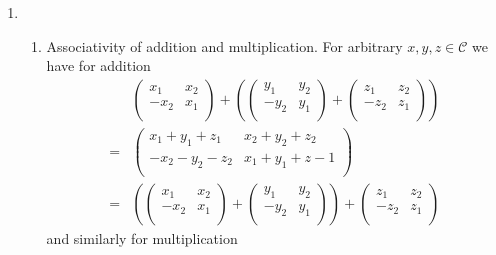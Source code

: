 \documentclass{article}
\begin{document}
\begin{enumerate}
    \item \begin{enumerate}[label={(\roman*)}]
        \item Associativity of addition and multiplication. For arbitrary $x, y, z \in \mathcal{C}$ we have for addition 
        \begin{align*}
            &\begin{pmatrix}
                x_1 & x_2 \\ -x_2 & x_1 \\
            \end{pmatrix} + \left(
                \begin{pmatrix}
                    y_1 & y_2 \\ -y_2 & y_1 \\
                \end{pmatrix}
                +
                \begin{pmatrix}
                    z_1 & z_2 \\ -z_2 & z_1 \\
                \end{pmatrix}
            \right)\\
            = &\begin{pmatrix}
                x_1 + y_1 + z_1 & x_2 + y_2 + z_2 \\
                -x_2 - y_2 - z_2 & x_1 + y_1 + z-1 \\
            \end{pmatrix}\\
            = &
            \left(
                \begin{pmatrix}
                    x_1 & x_2 \\ -x_2 & x_1 \\
                \end{pmatrix} + 
                \begin{pmatrix}
                    y_1 & y_2 \\ -y_2 & y_1 \\
                \end{pmatrix}
            \right)
            +
            \begin{pmatrix}
                z_1 & z_2 \\ -z_2 & z_1 \\
            \end{pmatrix}
        \end{align*}
        and similarly for multiplication
        \begin{align*}

\end{align*}
\end{enumerate}
\end{enumerate}
\end{document}
